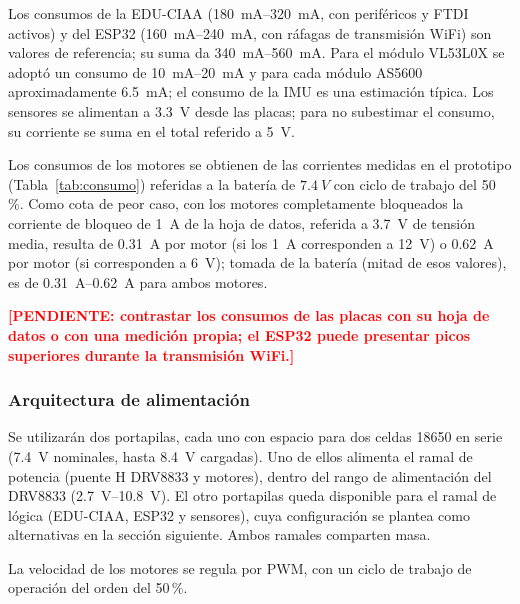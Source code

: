 \documentclass[12pt,a4paper]{article}
\newcommand{\pendiente}[1]{\textcolor{red}{\textbf{[PENDIENTE: #1]}}}
\begin{document}
\begin{visar}
Los consumos de la EDU-CIAA (\SI{180}{mA}--\SI{320}{mA}, con periféricos y FTDI activos) y del ESP32 (\SI{160}{mA}--\SI{240}{mA}, con ráfagas de transmisión WiFi) son valores de referencia; su suma da \SI{340}{mA}--\SI{560}{mA}. Para el módulo VL53L0X se adoptó un consumo de \SI{10}{mA}--\SI{20}{mA} y para cada módulo AS5600 aproximadamente \SI{6,5}{mA}; el consumo de la IMU es una estimación típica. Los sensores se alimentan a \SI{3,3}{V} desde las placas; para no subestimar el consumo, su corriente se suma en el total referido a \SI{5}{V}.

Los consumos de los motores se obtienen de las corrientes medidas en el prototipo (Tabla~\ref{tab:consumo}) referidas a la batería de $\SI{7,4}{V}$ con ciclo de trabajo del 50\,\%. Como cota de peor caso, con los motores completamente bloqueados la corriente de bloqueo de \SI{1}{A} de la hoja de datos, referida a \SI{3,7}{V} de tensión media, resulta de \SI{0,31}{A} por motor (si los \SI{1}{A} corresponden a \SI{12}{V}) o \SI{0,62}{A} por motor (si corresponden a \SI{6}{V}); tomada de la batería (mitad de esos valores), es de \SI{0,31}{A}--\SI{0,62}{A} para ambos motores.
\end{visar}
\pendiente{contrastar los consumos de las placas con su hoja de datos o con una medición propia; el ESP32 puede presentar picos superiores durante la transmisión WiFi.}

\subsubsection{Arquitectura de alimentación}
Se utilizarán dos portapilas, cada uno con espacio para dos celdas 18650 en serie (\SI{7,4}{V} nominales, hasta \SI{8,4}{V} cargadas). Uno de ellos alimenta el ramal de potencia (puente H DRV8833 y motores), dentro del rango de alimentación del DRV8833 (\SI{2,7}{V}--\SI{10,8}{V}). El otro portapilas queda disponible para el ramal de lógica (EDU-CIAA, ESP32 y sensores), cuya configuración se plantea como alternativas en la sección siguiente. Ambos ramales comparten masa.

\begin{visar}
La velocidad de los motores se regula por PWM, con un ciclo de trabajo de operación del orden del 50\,\%.
\end{visar}
\end{document}
